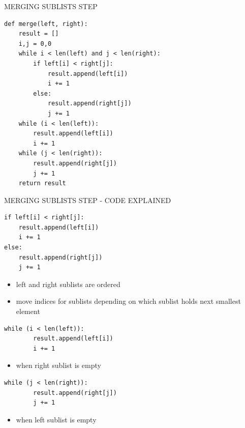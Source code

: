 \documentclass[aspectratio=169]{beamer}
\begin{document}
\begin{frame}[fragile]{MERGING SUBLISTS STEP}
\begin{lstlisting}
def merge(left, right):
	result = []
	i,j = 0,0
	while i < len(left) and j < len(right):
		if left[i] < right[j]:
			result.append(left[i])
			i += 1
		else:
			result.append(right[j])
			j += 1
	while (i < len(left)):
		result.append(left[i])
		i += 1
	while (j < len(right)):
		result.append(right[j])
		j += 1
	return result

\end{lstlisting}

\end{frame}


\begin{frame}[fragile]{MERGING SUBLISTS STEP - CODE EXPLAINED}
\begin{lstlisting}
if left[i] < right[j]:
	result.append(left[i])
	i += 1
else:
	result.append(right[j])
	j += 1
\end{lstlisting}
\begin{itemize}
\item left and right sublists are ordered
\item move indices for sublists depending on which sublist holds next smallest element
\end{itemize}
\begin{lstlisting}
while (i < len(left)):
		result.append(left[i])
		i += 1
\end{lstlisting}
\begin{itemize}
\item when right sublist is empty
\end{itemize}

\begin{lstlisting}
while (j < len(right)):
		result.append(right[j])
		j += 1
\end{lstlisting}
\begin{itemize}
\item when left sublist is empty
\end{itemize}
\end{frame}
\end{document}
